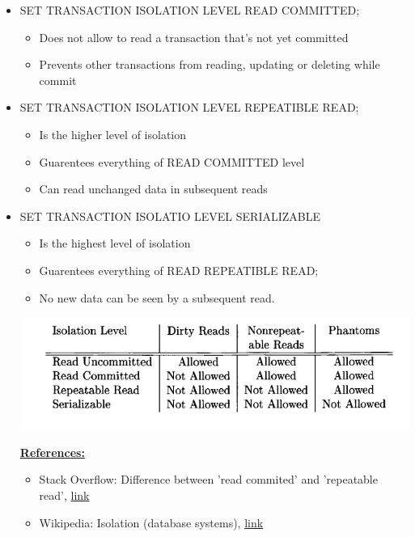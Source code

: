 \documentclass[12pt]{article}
\begin{document}
\begin{enumerate}[1.]
\begin{itemize}
\begin{itemize}
            \item SET TRANSACTION ISOLATION LEVEL READ COMMITTED;
            \begin{itemize}
                \item Does not allow to read a transaction that's not yet committed
                \item Prevents other transactions from reading, updating or deleting while commit
            \end{itemize}
            \item SET TRANSACTION ISOLATION LEVEL REPEATIBLE READ;
            \begin{itemize}
                \item Is the higher level of isolation
                \item Guarentees everything of READ COMMITTED level
                \item Can read unchanged data in subsequent reads
            \end{itemize}
            \item SET TRANSACTION ISOLATIO LEVEL SERIALIZABLE
            \begin{itemize}
                \item Is the highest level of isolation
                \item Guarentees everything of READ REPEATIBLE READ;
                \item No new data can be seen by a subsequent read.
            \end{itemize}

            \bigskip

            \begin{center}
            \includegraphics[width=0.7\linewidth]{images/worksheet_6_solution_4.png}
            \end{center}

            \bigskip

            \underline{\textbf{References:}}

            \begin{itemize}
                \item Stack Overflow: Difference between 'read commited' and 'repeatable read', \href{https://stackoverflow.com/questions/4034976/difference-between-read-commited-and-repeatable-read}{link}
                \item Wikipedia: Isolation (database systems), \href{https://en.wikipedia.org/wiki/Isolation_%28database_systems%29#READ_UNCOMMITTED_.28dirty_reads.29}{link}
            \end{itemize}
        \end{itemize}
    \end{itemize}


\end{enumerate}
\end{document}
